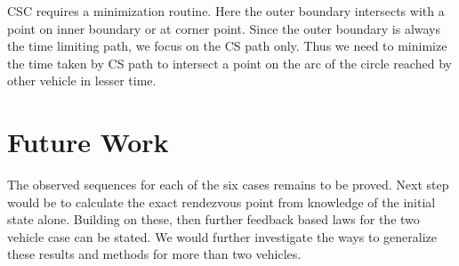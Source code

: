 \documentclass[11pt]{article} %
\begin{document}
 CSC requires a minimization routine. Here the outer boundary intersects with a point on inner boundary or at corner point. Since the outer boundary is always the time limiting path, we focus on the CS path only. Thus we need to minimize the time taken by CS path to intersect a point on the arc of the circle reached by other vehicle in lesser time.
  

\section{Future Work}
The observed sequences for each of the six cases remains to be proved. Next step would be to calculate the exact rendezvous point from knowledge of the initial state alone. Building on these, then further feedback based laws for the two vehicle case can be stated. We would further investigate the ways to generalize these results and methods for more than two vehicles.



\end{document}
